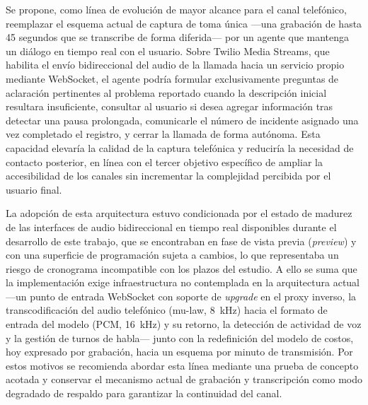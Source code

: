 Se propone, como línea de evolución de mayor alcance para el canal telefónico, reemplazar el esquema actual de captura de toma única ---una grabación de hasta 45 segundos que se transcribe de forma diferida--- por un agente que mantenga un diálogo en tiempo real con el usuario. Sobre Twilio Media Streams, que habilita el envío bidireccional del audio de la llamada hacia un servicio propio mediante WebSocket, el agente podría formular exclusivamente preguntas de aclaración pertinentes al problema reportado cuando la descripción inicial resultara insuficiente, consultar al usuario si desea agregar información tras detectar una pausa prolongada, comunicarle el número de incidente asignado una vez completado el registro, y cerrar la llamada de forma autónoma. Esta capacidad elevaría la calidad de la captura telefónica y reduciría la necesidad de contacto posterior, en línea con el tercer objetivo específico de ampliar la accesibilidad de los canales sin incrementar la complejidad percibida por el usuario final.

La adopción de esta arquitectura estuvo condicionada por el estado de madurez de las interfaces de audio bidireccional en tiempo real disponibles durante el desarrollo de este trabajo, que se encontraban en fase de vista previa (\emph{preview}) y con una superficie de programación sujeta a cambios, lo que representaba un riesgo de cronograma incompatible con los plazos del estudio. A ello se suma que la implementación exige infraestructura no contemplada en la arquitectura actual ---un punto de entrada WebSocket con soporte de \emph{upgrade} en el proxy inverso, la transcodificación del audio telefónico (mu-law, 8~kHz) hacia el formato de entrada del modelo (PCM, 16~kHz) y su retorno, la detección de actividad de voz y la gestión de turnos de habla--- junto con la redefinición del modelo de costos, hoy expresado por grabación, hacia un esquema por minuto de transmisión. Por estos motivos se recomienda abordar esta línea mediante una prueba de concepto acotada y conservar el mecanismo actual de grabación y transcripción como modo degradado de respaldo para garantizar la continuidad del canal.

\newpage
